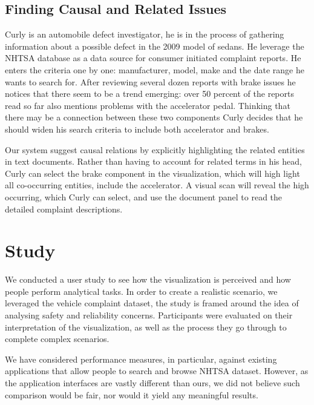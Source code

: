 \subsection{Finding Causal and Related Issues}
Curly is an automobile defect investigator, he is in the process of gathering
information about a possible defect in the 2009 model of sedans. He leverage the
NHTSA database as a data source for consumer initiated complaint reports. He
enters the criteria one by one: manufacturer, model, make and the date range he
wants to search for. After reviewing several dozen reports with brake issues he
notices that there seem to be a trend emerging: over 50 percent of the reports
read so far also mentions problems with the accelerator pedal. Thinking that
there may be a connection between these two components Curly decides that he
should widen his search criteria to include both accelerator and brakes.

Our system suggest causal relations by explicitly highlighting the related
entities in text documents. Rather than having to account for related terms in
his head, Curly can select the brake component in the visualization, which will
high light all co-occurring entities, include the accelerator. A visual scan
will reveal the high occurring, which Curly can select, and use the document
panel to read the detailed complaint descriptions.


\section{Study}
We conducted a user study to see how the visualization is perceived and how
people perform analytical tasks. In order to create a realistic scenario, we
leveraged the vehicle complaint dataset, the study is framed around the idea of
analysing safety and reliability concerns. Participants were evaluated on their
interpretation of the visualization, as well as the process they go through to 
complete complex scenarios. 

We have considered performance measures, in particular, against existing applications
that allow people to search and browse NHTSA dataset. However, as the application
interfaces are vastly different than ours, we did not believe such comparison would
be fair, nor would it yield any meaningful results.



